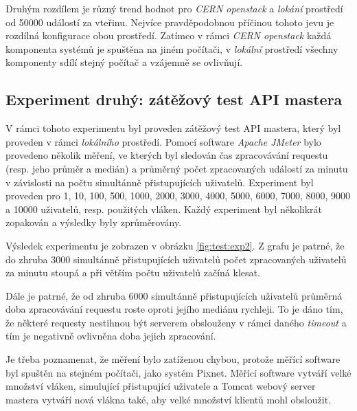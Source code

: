 Druhým rozdílem je různý trend hodnot pro \textit{CERN openstack} a \textit{lokání} prostředí od 50000 událostí za vteřinu. Nejvíce pravděpodobnou příčinou tohoto jevu je rozdílná konfigurace obou prostředí. Zatímco v rámci \textit{CERN openstack} každá komponenta systémů je spuštěna na jiném počítači, v \textit{lokální} prostředí všechny komponenty sdílí stejný počítač a vzájemně se ovlivňují.

\subsection{Experiment druhý: zátěžový test API mastera}
V rámci tohoto experimentu byl proveden zátěžový test API mastera, který byl proveden v rámci \textit{lokálního} prostředí. Pomocí software \textit{Apache JMeter} bylo provedeno několik měření, ve kterých byl sledován čas zpracovávání requestu (resp. jeho průměr a medián) a průměrný počet zpracovaných událostí za minutu v závislosti na počtu simultánně přistupujících uživatelů. Experiment byl proveden pro 1, 10, 100, 500, 1000, 2000, 3000, 4000, 5000, 6000, 7000, 8000, 9000 a 10000 uživatelů, resp. použitých vláken. Každý experiment byl několikrát zopakován a výsledky byly zprůměrovány. 

Výsledek experimentu je zobrazen v obrázku \ref{fig:test:exp2}. Z grafu je patrné, že do zhruba 3000 simultánně přistupujících uživatelů počet zpracovaných uživatelů za minutu stoupá a při větším počtu uživatelů začíná klesat. 

Dále je patrné, že od zhruba 6000 simultánně přistupujících uživatelů průměrná doba zpracovávání requestu roste oproti jejího mediánu rychleji. To je dáno tím, že některé requesty nestihnou být serverem obslouženy v rámci daného \textit{timeout} a tím je negativně ovlivněna doba jejich zpracování.

Je třeba poznamenat, že měření bylo zatíženou chybou, protože měřící software byl spuštěn na stejném počítači, jako systém Pixnet. Měřící software vytváří velké množství vláken, simulující přistupující uživatele a Tomcat webový server mastera vytváří nová vlákna také, aby velké množství klientů mohl obsloužit.

